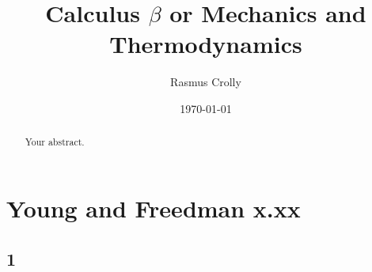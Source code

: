 \documentclass[12pt,a4paper]{article}
\title{Calculus $\beta$ or Mechanics and Thermodynamics}
\author{Rasmus Crolly}
\date{\today}
\begin{document}
\maketitle

\begin{abstract}
Your abstract.
\end{abstract}

\section{Young and Freedman x.xx}

\subsection{1}

\begin{lstlisting}[language=Python]
\end{lstlisting}

\printbibliography[
heading=bibintoc,
title={References}
]
\end{document}
